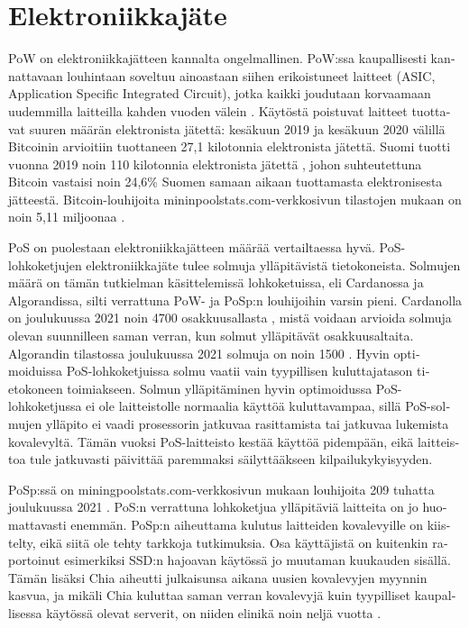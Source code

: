 \section{Elektroniikkajäte\label{elektroniikkajate}}
\begin{otherlanguage}{english}

PoW on elektroniikkajätteen kannalta ongelmallinen. PoW:ssa kaupallisesti kannattavaan louhintaan soveltuu ainoastaan siihen erikoistuneet laitteet (ASIC, Application Specific Integrated Circuit), jotka kaikki joudutaan korvaamaan uudemmilla laitteilla kahden vuoden välein \cite{btc-carbon-ewaste}. Käytöstä poistuvat laitteet tuottavat suuren määrän elektronista jätettä: kesäkuun 2019 ja kesäkuun 2020 välillä Bitcoinin arvioitiin tuottaneen 27,1 kilotonnia elektronista jätettä. Suomi tuotti vuonna 2019 noin 110 kilotonnia elektronista jätettä \cite{ewaste-finland}, johon suhteutettuna Bitcoin vastaisi noin 24,6\% Suomen samaan aikaan tuottamasta elektronisesta jätteestä. Bitcoin-louhijoita mininpoolstats.com-verkkosivun tilastojen mukaan on noin 5,11 miljoonaa \cite{btc-pool-stats-miner-count}.

PoS on puolestaan elektroniikkajätteen määrää vertailtaessa hyvä. PoS-lohkoketjujen elektroniikkajäte tulee solmuja ylläpitävistä tietokoneista. Solmujen määrä on tämän tutkielman käsittelemissä lohkoketuissa, eli Cardanossa ja Algorandissa, silti verrattuna PoW- ja PoSp:n louhijoihin varsin pieni. Cardanolla on joulukuussa 2021 noin 4700 osakkuusallasta \cite{cardano-staking-pools}, mistä voidaan arvioida solmuja olevan suunnilleen saman verran, kun solmut ylläpitävät osakkuusaltaita. Algorandin tilastossa joulukuussa 2021 solmuja on noin 1500 \cite{algorand-tps-nodes-etc}. Hyvin optimoiduissa PoS-lohkoketjuissa solmu vaatii vain tyypillisen kuluttajatason tietokoneen toimiakseen. Solmun ylläpitäminen hyvin optimoidussa PoS-lohkoketjussa ei ole laitteistolle normaalia käyttöä kuluttavampaa, sillä PoS-solmujen ylläpito ei vaadi prosessorin jatkuvaa rasittamista tai jatkuvaa lukemista kovalevyltä. Tämän vuoksi PoS-laitteisto kestää käyttöä pidempään, eikä laitteistoa tule jatkuvasti päivittää paremmaksi säilyttääkseen kilpailukykyisyyden.

PoSp:ssä on miningpoolstats.com-verkkosivun mukaan louhijoita 209 tuhatta joulukuussa 2021 \cite{chia-pool-stats}. PoS:n verrattuna lohkoketjua ylläpitäviä laitteita on jo huomattavasti enemmän. PoSp:n aiheuttama kulutus laitteiden kovalevyille on kiistelty, eikä siitä ole tehty tarkkoja tutkimuksia. Osa käyttäjistä on kuitenkin raportoinut esimerkiksi SSD:n hajoavan käytössä jo muutaman kuukauden sisällä. Tämän lisäksi Chia aiheutti julkaisunsa aikana uusien kovalevyjen myynnin kasvua, ja mikäli Chia kuluttaa saman verran kovalevyjä kuin tyypilliset kaupallisessa käytössä olevat serverit, on niiden elinikä noin neljä vuotta \cite{manufacturingcarbon1}.


\end{otherlanguage}
